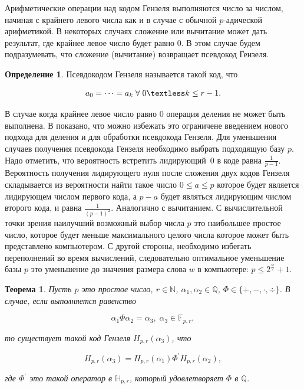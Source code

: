 \documentclass[master, och, diploma, times]{sty/SCWorks}
\theoremstyle{plain}
\newtheorem{thethm}{Теорема}[section]
\theoremstyle{definition}
\newtheorem{defn}{Определение}[section]
\numberwithin{equation}{section}
\begin{document}
Арифметические операции над кодом Гензеля выполняются число за числом, начиная с крайнего левого числа как и в случае с обычной $p$-адической арифметикой. В некоторых случаях сложение или вычитание может дать результат, где крайнее левое число будет равно $0$. В этом случае будем подразумевать, что сложение (вычитание) возвращает псевдокод Гензеля.

\begin{defn}
Псевдокодом Гензеля называется такой код, что 

\begin{equation}
a_0=\dots=a_k \; \forall \; 0 \textless k \leq r-1.
\end{equation}

\end{defn}

В случае когда крайнее левое число равно $0$ операция деления не может быть выполнена. В \cite{bib:numbers:limongelli} показано, что можно избежать это ограничене \mbox{введением} нового подхода для деления и для обработки псевдокода \mbox{Гензеля}.
Для уменьшения случаев получения псевдокода Гензеля \mbox{необходимо} выбрать подходящую базу $p$. Надо отметить, что вероятность встретить \mbox{лидирующий $0$} в коде равна $\frac{1}{p-1}$. Вероятность получения лидирующего нуля после \mbox{сложения} двух кодов Гензеля складывается из вероятности найти такое число $0 \leq a \leq p$ которое будет является лидирующем числом первого кода, а $p-a$ будет являться лидирующим числом второго кода, и равна $\frac{1}{{(p-1)}^{2}}$. Аналогично с вычитанием. С вычислительной точки зрения наилучший возможный выбор числа $p$ это наибольшее простое число, которое будет меньше максимального целого числа которое может быть представлено компьютером. С другой стороны, необходимо избегать переполнений во время вычислений, следовательно оптимальное уменьшение базы $p$ это уменьшение до значения размера слова $w$ в компьютере: $p \leq 2^\frac{w}{2}+1$.

\begin{thethm}\label{th:hensel}
Пусть $p$ это простое число, $r \in \mathbb{N}$, $\alpha_1, \alpha_2 \in \mathbb{Q}$, $\Phi \in \{+, -, \cdot , \div \}$. В случае, если выполняется равенство

\begin{equation}
\alpha_1\Phi \alpha_2 = \alpha_3, \; \alpha_3 \in \mathbb{F}_{p,r},
\end{equation}

\noindent то существует такой код Гензеля $H_{p,r}(\alpha_3)$, что

\begin{equation}
H_{p,r}(\alpha_3)=H_{p,r}(\alpha_1)\Phi^{'}H_{p,r}(\alpha_2),
\end{equation}

\noindent где $\Phi^{'}$ это такой оператор в $\mathbb{H}_{p,r}$, который удовлетворяет $\Phi$ в $\mathbb{Q}$.

\end{thethm}
\end{document}
